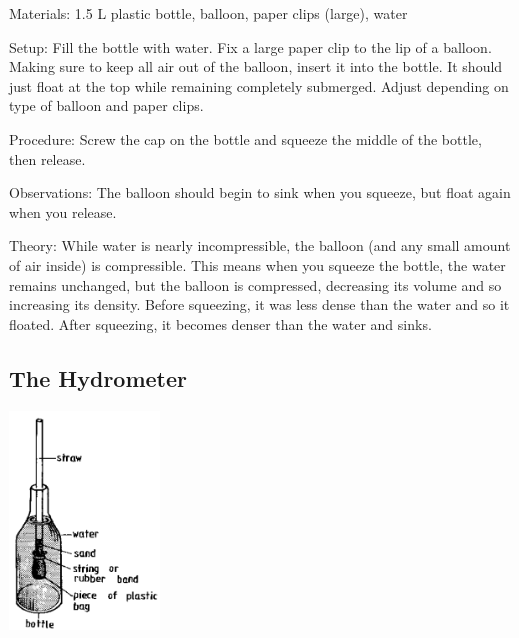 \begin{multicols}{2}
\begin{description*}
\item[Materials:]{1.5 L plastic bottle, balloon, paper clips (large), water}
\item[Setup:]{Fill the bottle with water. Fix a large paper clip to the lip of a balloon. Making sure to keep all air out of the balloon, insert it into the bottle. It should just float at the top while remaining completely submerged. Adjust depending on type of balloon and paper clips.}
\item[Procedure:]{Screw the cap on the bottle and squeeze the middle of the bottle, then release.}
\item[Observations:]{The balloon should begin to sink when you squeeze, but float again when you release.}
\item[Theory:]{While water is nearly incompressible, the balloon (and any small amount of air inside) is compressible. This means when you squeeze the bottle, the water remains unchanged, but the balloon is compressed, decreasing its volume and so increasing its density. Before squeezing, it was less dense than the water and so it floated. After squeezing, it becomes denser than the water and sinks.}
\end{description*}

\subsection{The Hydrometer}

\begin{center}
\includegraphics[width=0.3\textwidth]{./img/source/hydrometer.png}
\end{center}


\end{multicols}
